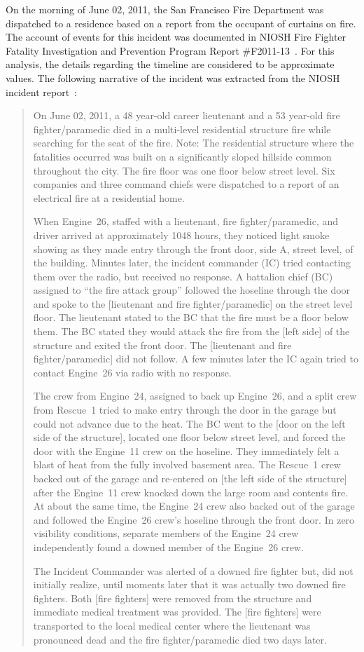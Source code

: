 \documentclass[12pt,oneside]{book}
\begin{document}
On the morning of June 02, 2011, the San Francisco Fire Department was dispatched to a residence based on a report from the occupant of curtains on fire. The account of events for this incident was documented in NIOSH Fire Fighter Fatality Investigation and Prevention Program Report \#F2011-13~\cite{NIOSH:Bowyer2}. For this analysis, the details regarding the timeline are considered to be approximate values. The following narrative of the incident was extracted from the NIOSH incident report~\cite{NIOSH:Bowyer2}:
\begin{quote}
On June 02, 2011, a 48 year-old career lieutenant and a 53 year-old fire fighter/paramedic died in a multi-level residential structure fire while searching for the seat of the fire. Note: The residential structure where the fatalities occurred was built on a significantly sloped hillside common throughout the city. The fire floor was one floor below street level. Six companies and three command chiefs were dispatched to a report of an electrical fire at a residential home.

When Engine~26, staffed with a lieutenant, fire fighter/paramedic, and driver arrived at approximately 1048 hours, they noticed light smoke showing as they made entry through the front door, side A, street level, of the building. Minutes later, the incident commander (IC) tried contacting them over the radio, but received no response. A battalion chief (BC) assigned to ``the fire attack group'' followed the hoseline through the door and spoke to the [lieutenant and fire fighter/paramedic] on the street level floor. The lieutenant stated to the BC that the fire must be a floor below them. The BC stated they would attack the fire from the [left side] of the structure and exited the front door. The [lieutenant and fire fighter/paramedic] did not follow. A few minutes later the IC again tried to contact Engine~26 via radio with no response.

The crew from Engine~24, assigned to back up Engine~26, and a split crew from Rescue~1 tried to make entry through the door in the garage but could not advance due to the heat. The BC went to the [door on the left side of the structure], located one floor below street level, and forced the door with the Engine~11 crew on the hoseline. They immediately felt a blast of heat from the fully involved basement area. The Rescue~1 crew backed out of the garage and re-entered on [the left side of the structure] after the Engine~11 crew knocked down the large room and contents fire. At about the same time, the Engine~24 crew also backed out of the garage and followed the Engine~26 crew's hoseline through the front door. In zero visibility conditions, separate members of the Engine~24 crew independently found a downed member of the Engine~26 crew.

The Incident Commander was alerted of a downed fire fighter but, did not initially realize, until moments later that it was actually two downed fire fighters. Both [fire fighters] were removed from the structure and immediate medical treatment was provided. The [fire fighters] were transported to the local medical center where the lieutenant was pronounced dead and the fire fighter/paramedic died two days later.
\end{quote}
\end{document}
